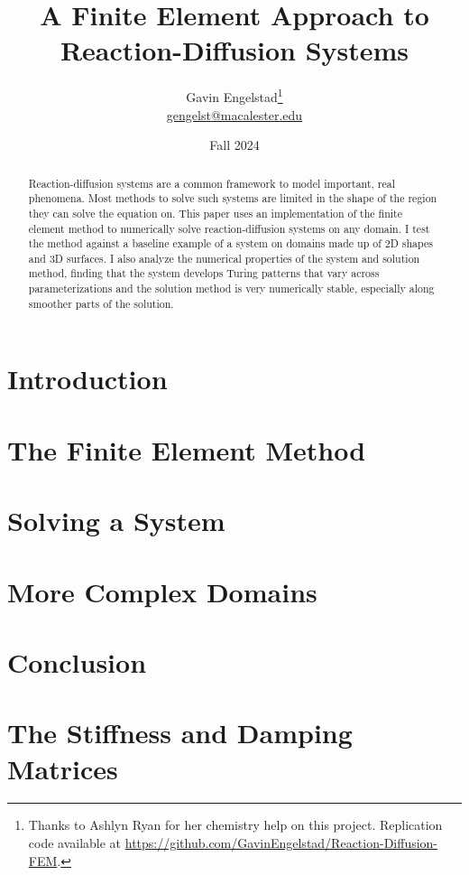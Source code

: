 \documentclass[11pt]{article}
\title{A Finite Element Approach to Reaction-Diffusion Systems}
\author{Gavin Engelstad\thanks{Thanks to Ashlyn Ryan for her chemistry help on this project. Replication code available at \url{https://github.com/GavinEngelstad/Reaction-Diffusion-FEM}.} \\ \href{mailto:gengelst@macalester.edu}{gengelst@macalester.edu}}
\date{Fall 2024}
\numberwithin{equation}{section} %
\numberwithin{figure}{section} %
\numberwithin{table}{section} %
\begin{document}
\maketitle

\begin{abstract}
    Reaction-diffusion systems are a common framework to model important, real phenomena. Most methods to solve such systems are limited in the shape of the region they can solve the equation on. This paper uses an implementation of the finite element method to numerically solve reaction-diffusion systems on any domain. I test the method against a baseline example of a system on domains made up of 2D shapes and 3D surfaces. I also analyze the numerical properties of the system and solution method, finding that the system develops Turing patterns that vary across parameterizations and the solution method is very numerically stable, especially along smoother parts of the solution. 
\end{abstract}


\section{Introduction} \label{sec:intro}


\section{The Finite Element Method} \label{sec:fem}



\section{Solving a System} \label{sec:sols}



\section{More Complex Domains} \label{sec:doms}



\section{Conclusion} \label{sec:concl}



\newpage
\printbibliography
\FloatBarrier


\newpage
\appendix

\section{The Stiffness and Damping Matrices} \label{app:mats}

\FloatBarrier
\end{document}
